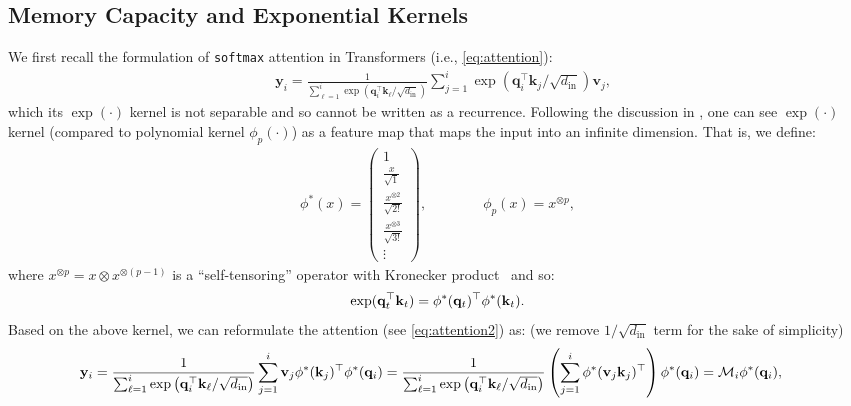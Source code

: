 \subsection{Memory Capacity and Exponential Kernels}\label{sec:deeptransformer-capacity}
We first recall the formulation of \texttt{softmax} attention in Transformers (i.e., \autoref{eq:attention}):
\begin{align}\label{eq:attention2}
    &\mathbf{y}_i = \frac{1}{{\sum_{\ell = 1}^{i} \exp\left( \mathbf{q}_i^{\top} \mathbf{k}_{\ell}/\sqrt{d_{\text{in}}}\right)}} \sum_{j = 1}^{i} \exp\left( \mathbf{q}_i^{\top} \mathbf{k}_j/\sqrt{d_{\text{in}}}\right) \mathbf{v}_j,
\end{align}
which its $\exp(\cdot)$ kernel is not separable and so cannot be written as a recurrence. Following the discussion in \citet{polysketchformer-kacham2024}, one can see $\exp(\cdot)$ kernel (compared to polynomial kernel $\phi_p(\cdot)$) as a feature map that maps the input into an infinite dimension. That is, we define: 
\begin{align}\label{eq:infi-map}
    \phi^{*}(x) = \begin{pmatrix}
    1 \\
    \frac{x}{\sqrt{1}} \\
    \frac{x^{\otimes 2}}{\sqrt{2!}} \\
    \frac{x^{\otimes 3}}{\sqrt{3!}} \\
    \vdots
    \end{pmatrix}, \qquad\qquad \phi_p(x) = 
    x^{\otimes p},
\end{align}
where $x^{\otimes p} = x \otimes x^{\otimes (p-1)}$ is a ``self-tensoring'' operator with Kronecker product~\citep{polysketchformer-kacham2024} and so:
\begin{align}
    \exp(\mathbf{q}_t^{\top} \mathbf{k}_t) = \phi^{*}(\mathbf{q}_t)^{\top} \phi^{*}(\mathbf{k}_t).
\end{align}
Based on the above kernel, we can reformulate the attention (see \autoref{eq:attention2}) as: (we remove $1/\sqrt{d_{\text{in}}}$ term for the sake of simplicity)
\begin{align}
    &\mathbf{y}_i = \frac{1}{{\sum_{\ell = 1}^{i} \exp\left( \mathbf{q}_i^{\top} \mathbf{k}_{\ell}/\sqrt{d_{\text{in}}}\right)}} \sum_{j = 1}^{i}  \mathbf{v}_j \phi^{*}(\mathbf{k}_j)^{\top} \phi^{*}(\mathbf{q}_i)  = \frac{1}{{\sum_{\ell = 1}^{i} \exp\left( \mathbf{q}_i^{\top} \mathbf{k}_{\ell}/\sqrt{d_{\text{in}}}\right)}} \left(\sum_{j = 1}^{i}  \phi^{*}(\mathbf{v}_j \mathbf{k}_j)^{\top}  \right) \phi^{*}(\mathbf{q}_i) = \mathcal{M}_i \phi^{*}(\mathbf{q}_i),
\end{align}

